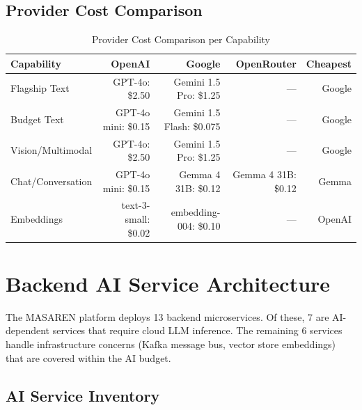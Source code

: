 \documentclass[11pt,a4paper]{article}
\begin{document}
\subsection{Provider Cost Comparison}

\begin{table}[H]
\centering
\begin{tabular}{|l|r|r|r|r|}
\hline
\textbf{Capability} & \textbf{OpenAI} & \textbf{Google} & \textbf{OpenRouter} & \textbf{Cheapest} \\
\hline
Flagship Text & GPT-4o: \$2.50 & Gemini 1.5 Pro: \$1.25 & --- & Google \\
\hline
Budget Text & GPT-4o mini: \$0.15 & Gemini 1.5 Flash: \$0.075 & --- & Google \\
\hline
Vision/Multimodal & GPT-4o: \$2.50 & Gemini 1.5 Pro: \$1.25 & --- & Google \\
\hline
Chat/Conversation & GPT-4o mini: \$0.15 & Gemma 4 31B: \$0.12 & Gemma 4 31B: \$0.12 & Gemma \\
\hline
Embeddings & text-3-small: \$0.02 & embedding-004: \$0.10 & --- & OpenAI \\
\hline
\end{tabular}
\caption{Provider Cost Comparison per Capability}
\end{table}

\newpage

\section{Backend AI Service Architecture}

The MASAREN platform deploys 13 backend microservices. Of these, 7 are AI-dependent services that require cloud LLM inference. The remaining 6 services handle infrastructure concerns (Kafka message bus, vector store embeddings) that are covered within the AI budget.

\subsection{AI Service Inventory}
\end{document}

